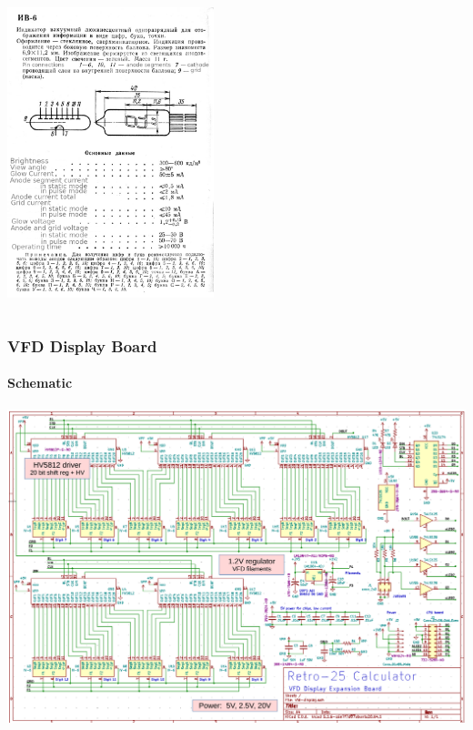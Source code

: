 \documentclass{beamer}
\begin{document}
\begin{frame}
\begin{columns}
    \includegraphics[width=0.45\textwidth]{figs/iv-6-datasheet-translated.png}
  \end{columns}
\end{frame}

\begin{frame}
  \frametitle{VFD Display Board}
  \framesubtitle{Schematic}
  \includegraphics[width=\textwidth]{figs/vfd-schem-ann.pdf}
\end{frame}
\end{document}
